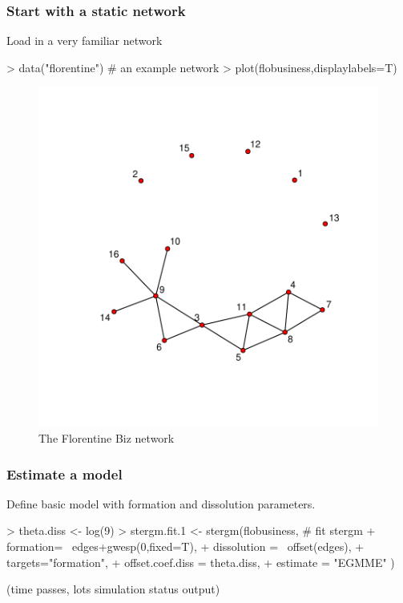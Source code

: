 \documentclass{beamer}
\begin{document}
\begin{frame}[fragile]
\frametitle{Start with a static network}
Load in a very familiar network
\begin{Schunk}
\begin{Sinput}
> data("florentine") # an example network
> plot(flobusiness,displaylabels=T)
\end{Sinput}
\end{Schunk}

\begin{figure}
  \centering
\includegraphics{ndtvDemo-load_net}

\caption{The Florentine Biz network}
\end{figure}

\end{frame}
\begin{frame}[fragile]
\frametitle{Estimate a model}
Define basic \verb@stergm@ model with formation and dissolution parameters.
\begin{Schunk}
\begin{Sinput}
> theta.diss <- log(9)
> stergm.fit.1 <- stergm(flobusiness, # fit stergm
+   formation= ~edges+gwesp(0,fixed=T),
+ 	dissolution = ~offset(edges),
+ 	targets="formation",
+ 	offset.coef.diss = theta.diss,
+ 	estimate = "EGMME"	)
\end{Sinput}
\end{Schunk}
(time passes, lots simulation status output)
\end{frame}
\end{document}
